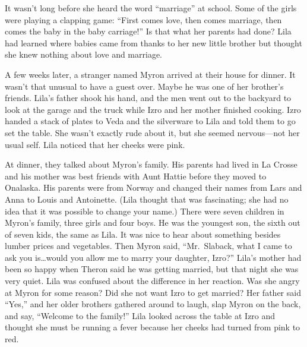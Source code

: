 \documentclass[
  american,
  letterpaper,
]{book}
\begin{document}
It wasn't long before she heard the word ``marriage'' at school. Some of
the girls were playing a clapping game: ``First comes love, then comes
marriage, then comes the baby in the baby carriage!'' Is that what her
parents had done? Lila had learned where babies came from thanks to her
new little brother but thought she knew nothing about love and marriage.

A few weeks later, a stranger named Myron arrived at their house for
dinner. It wasn't that unusual to have a guest over. Maybe he was one of
her brother's friends. Lila's father shook his hand, and the men went
out to the backyard to look at the garage and the truck while Izro and
her mother finished cooking. Izro handed a stack of plates to Veda and
the silverware to Lila and told them to go set the table. She wasn't
exactly rude about it, but she seemed nervous---not her usual self. Lila
noticed that her cheeks were pink.

At dinner, they talked about Myron's family. His parents had lived in La
Crosse and his mother was best friends with Aunt Hattie before they
moved to Onalaska. His parents were from Norway and changed their names
from Lars and Anna to Louis and Antoinette. (Lila thought that was
fascinating; she had no idea that it was possible to change your name.)
There were seven children in Myron's family, three girls and four boys.
He was the youngest son, the sixth out of seven kids, the same as Lila.
It was nice to hear about something besides lumber prices and
vegetables. Then Myron said, ``Mr.~Slaback, what I came to ask you
is\ldots would you allow me to marry your daughter, Izro?'' Lila's
mother had been so happy when Theron said he was getting married, but
that night she was very quiet. Lila was confused about the difference in
her reaction. Was she angry at Myron for some reason? Did she not want
Izro to get married? Her father said ``Yes,'' and her older brothers
gathered around to laugh, slap Myron on the back, and say, ``Welcome to
the family!'' Lila looked across the table at Izro and thought she must
be running a fever because her cheeks had turned from pink to red.
\end{document}
